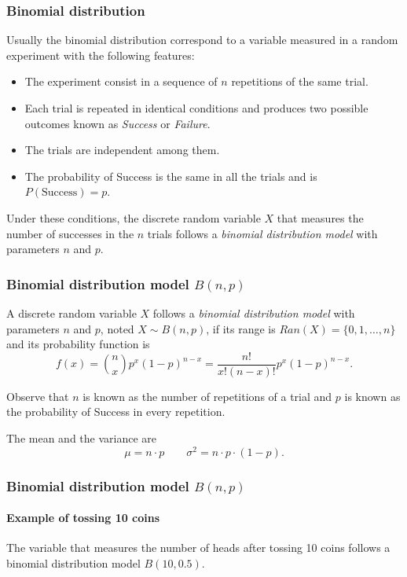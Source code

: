 \begin{frame}
\frametitle{Binomial distribution}
Usually the binomial distribution correspond to a variable measured in a random experiment with the following features:
\begin{itemize}
\item The experiment consist in a sequence of $n$ repetitions of the same trial.
\item Each trial is repeated in identical conditions and produces two possible outcomes known as \emph{Success} or
\emph{Failure}.
\item The trials are independent among them.
\item The probability of Success is the same in all the trials and is $P(\mbox{Success})=p$.
\end{itemize}

Under these conditions, the discrete random variable $X$ that measures the number of successes in the $n$ trials follows
a \emph{binomial distribution model} with parameters $n$ and $p$.
\end{frame}


\begin{frame}
\frametitle{Binomial distribution model $B(n,p)$}
\begin{definition}
A discrete random variable $X$ follows a \emph{binomial distribution model} with parameters $n$ and $p$, noted 
$X\sim B(n,p)$, if its range is $Ran(X) = \{0,1,\ldots,n\}$ and its probability function is
\[
f(x) = \binom{n}{x}p^x(1-p)^{n-x} = \frac{n!}{x!(n-x)!}p^x(1-p)^{n-x}.
\]
\end{definition}

Observe that $n$ is known as the number of repetitions of a trial and $p$ is known as the probability of Success in
every repetition. 

The mean and the variance are
\[
\mu = n\cdot p \qquad \sigma^2 = n\cdot p\cdot (1-p).
\]
\end{frame}


\begin{frame}
\frametitle{Binomial distribution model $B(n,p)$}
\framesubtitle{Example of tossing 10 coins}
The variable that measures the number of heads after tossing 10 coins follows a binomial distribution model $B(10,0.5)$.
\begin{center}
\scalebox{0.65}{}
\end{center}
\end{frame}


